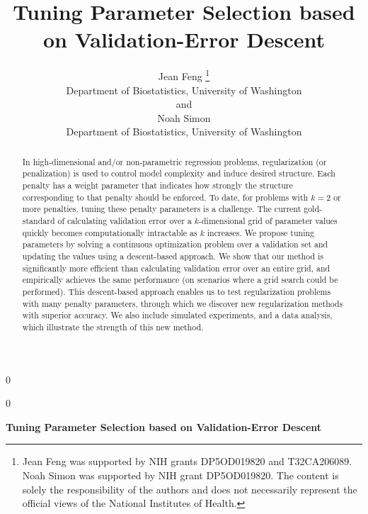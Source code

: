 \documentclass[12pt,letterpaper]{article}
\newcommand{\blind}{0}
\begin{document}
%

\def\spacingset#1{\renewcommand{\baselinestretch}%
{#1}\small\normalsize} \spacingset{1}



\blind
{
 
  \title{\bf Tuning Parameter Selection based on Validation-Error Descent}
    \author{Jean Feng
    \thanks{
    Jean Feng was supported by NIH grants DP5OD019820 and T32CA206089.
    Noah Simon was supported by NIH grant DP5OD019820.
    The content is solely the responsibility of the authors and does not necessarily represent the official views of the National Institutes of Health.
    }
    \hspace{.2cm}\\
    Department of Biostatistics, University of Washington\\
    and \\
    Noah Simon \\
    Department of Biostatistics, University of Washington}
  \maketitle
} \fi

\blind
{
  \bigskip
  \bigskip
  \bigskip
  \begin{center}
    {\LARGE\bf Tuning Parameter Selection based on Validation-Error Descent}
\end{center}
  \medskip
} \fi

\bigskip
\begin{abstract}
In high-dimensional and/or non-parametric regression problems, regularization (or penalization) is used to control model complexity and induce desired structure. Each penalty has a weight parameter that indicates how strongly the structure corresponding to that penalty should be enforced. To date, for problems with $k=2$ or more penalties, tuning these penalty parameters is a challenge. The current gold-standard of calculating validation error over a $k$-dimensional grid of parameter values quickly becomes computationally intractable as $k$ increases. We propose tuning parameters by solving a continuous optimization problem over a validation set and updating the values using a descent-based approach. We show that our method is significantly more efficient than calculating validation error over an entire grid, and empirically achieves the same performance (on scenarios where a grid search could be performed). This descent-based approach enables us to test regularization problems with many penalty parameters, through which we discover new regularization methods with superior accuracy. We also include simulated experiments, and a data analysis, which illustrate the strength of this new method.
\end{abstract}
\end{document}
